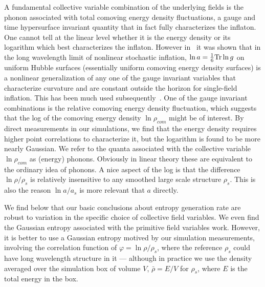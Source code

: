 \documentclass[11pt,a4paper]{article}
\def\Trace{{\rm Tr}}
\begin{document}
A fundamental collective variable combination of the underlying fields is the phonon associated with total comoving energy density fluctuations, a gauge and time hypersurface invariant quantity that in fact fully characterizes the inflaton. 
One cannot tell at the linear level whether it is the energy density or its logarithm which best characterizes the inflaton.
However in~\cite{Salopek:1990jq,Salopek:1990re} it was shown that in the long wavelength limit of nonlinear stochastic inflation, $\ln a = {1\over 6} \Trace \ln g $ on uniform Hubble surfaces (essentially uniform comoving energy density surfaces) is a nonlinear generalization of any one of the gauge invariant variables that characterize curvature and are constant outside the horizon for single-field inflation. 
This has been much used subsequently~\cite{Sasaki:1995aw}.
One of the gauge invariant combinations is the relative comoving energy density fluctuation, 
which suggests that the log of the comoving energy density $\ln \rho_{com}$ might be of interest. 
By direct measurements in our simulations, we find that the energy density requires higher point correlations to characterize it, but the logarithm is found to be more nearly Gaussian. 
We refer to the quanta associated with the collective variable  $\ln \rho_{com}$ as (energy) phonons. 
Obviously in linear theory these are equivalent to the ordinary idea of phonons. 
A nice aspect of the log is that  the difference $\ln \rho / \rho_s$ is relatively insensitive to any smoothed large scale structure $\rho_s$. This is also the reason $\ln a/a_s$ is more relevant that $a$ directly. 

We find below that our basic conclusions about entropy generation rate are robust to variation in the specific choice of collective field variables.
We even find the Gaussian entropy associated with the primitive field variables work.  
However, it is better to use a Gaussian entropy motived by our simulation measurements, involving the correlation function of 
$\varphi = \ln \rho /\rho_s$, where the reference $\rho_s$ could have long wavelength structure in it --- although in practice we use the density averaged over the simulation box of volume $V$, $ \bar{\rho}=E/V $ for $\rho_s$, where $E$ is the total energy in the box. 
\end{document}

